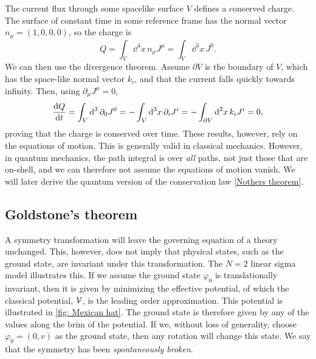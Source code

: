 The current flux through some spacelike surface $V$ defines a conserved charge. The surface of constant time in some reference frame has the normal vector $n_\mu = (1, 0, 0, 0)$, so the charge is
%
\begin{equation}
    Q = \int_V \dd^4 x \, n_\mu J^\mu = \int_V \dd^3 x \, J^0.
\end{equation}
%
We can then use the divergence theorem.
Assume $\partial V$ is the boundary of $V$, which has the space-like normal vector $k_i$, and that the current falls quickly towards infinity.
Then, using $\partial_\mu J^\mu = 0 $,
\begin{equation}
    \odv{Q}{t} 
    = \int_V \dd^3 \, \partial_0 J^0
    = - \int_V \dd^3 x \, \partial_i J^i 
    = - \int_{\partial V} \dd^2 x\, k_i J^i 
    = 0,
\end{equation}
%
proving that the charge is conserved over time.
These results, however, rely on the equations of motion.
This is generally valid in classical mechanics.
However, in quantum mechanics, the path integral is over \emph{all} paths, not just those that are on-shell, and we can therefore not assume the equations of motion vanish.
We will later derive the quantum version of the conservation law \autoref{Nothers theorem}.




\subsection{Goldstone's theorem}

A symmetry transformation will leave the governing equation of a theory unchanged.
This, however, does not imply that physical states, such as the ground state, are invariant under this transformation.
The $N = 2$ linear sigma model illustrates this.
If we assume the ground state $\varphi_{0}$ is translationally invariant, then it is given by minimizing the effective potential, of which the classical potential, $\mathcal{V}$, is the leading order approximation.
This potential is illustrated in \autoref{fig: Mexican hat}.
The ground state is therefore given by any of the values along the brim of the potential.
If we, without loss of generality, choose $\varphi_0 = (0, v)$ as the ground state, then any rotation will change this state.
We say that the symmetry has been \emph{spontaneously broken}.

